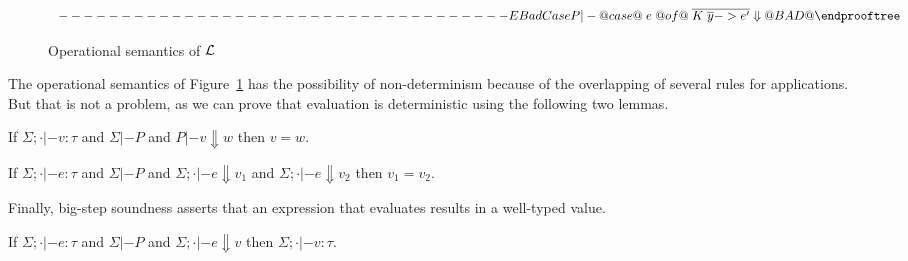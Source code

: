 \begin{figure}
\[\begin{array}{c}
\begin{array}{c}
\end{array}
------------------------------------{EBadCase}
P |- @case@\;e\;@of@\;\ol{K\;\ol{y} -> e'} \Downarrow @BAD@
\endprooftree
\end{array}\]
\caption{Operational semantics of $\cal L$}\label{fig:opsem}
\end{figure}
The operational semantics of Figure~\ref{fig:opsem} has the possibility of non-determinism because
of the overlapping of several rules for applications. But that is not a problem, as we can prove that evaluation
is deterministic using the following two lemmas.
\begin{lemma}
If $\Sigma;\cdot |- v : \tau$ and
$\Sigma |- P$ and $P |- v \Downarrow w$ then $ v = w $.
\end{lemma}
\begin{lemma}
If $\Sigma;\cdot |- e : \tau$ and
$\Sigma |- P$ and $\Sigma;\cdot |- e \Downarrow v_1$ and $\Sigma;\cdot |- e \Downarrow v_2$ then
$v_1 = v_2$.
\end{lemma}
Finally, big-step soundness asserts that an expression that evaluates results in a
well-typed value.
\begin{lemma}
If $\Sigma;\cdot |- e : \tau$ and
$\Sigma |- P$ and $\Sigma;\cdot |- e \Downarrow v$ then $\Sigma;\cdot |- v : \tau$.
\end{lemma}


